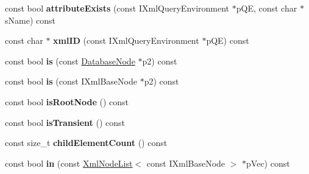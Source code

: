 \begin{DoxyCompactItemize}
\item 
\hypertarget{classgeneral__server_1_1DatabaseNode_a3c6491f102f4aa34694dbfd75b604fc4}{const bool {\bfseries attribute\-Exists} (const \-I\-Xml\-Query\-Environment $\ast$p\-Q\-E, const char $\ast$s\-Name) const }\label{classgeneral__server_1_1DatabaseNode_a3c6491f102f4aa34694dbfd75b604fc4}

\item 
\hypertarget{classgeneral__server_1_1DatabaseNode_a3a1ff38b852860e067c862c116692a0e}{const char $\ast$ {\bfseries xml\-I\-D} (const \-I\-Xml\-Query\-Environment $\ast$p\-Q\-E) const }\label{classgeneral__server_1_1DatabaseNode_a3a1ff38b852860e067c862c116692a0e}

\item 
\hypertarget{classgeneral__server_1_1DatabaseNode_a44727abe0238201126541c209bc9aba6}{const bool {\bfseries is} (const \hyperlink{classgeneral__server_1_1DatabaseNode}{\-Database\-Node} $\ast$p2) const }\label{classgeneral__server_1_1DatabaseNode_a44727abe0238201126541c209bc9aba6}

\item 
\hypertarget{classgeneral__server_1_1DatabaseNode_ab7c301d969b4e478a6bf0699966b1311}{const bool {\bfseries is} (const \-I\-Xml\-Base\-Node $\ast$p2) const }\label{classgeneral__server_1_1DatabaseNode_ab7c301d969b4e478a6bf0699966b1311}

\item 
\hypertarget{classgeneral__server_1_1DatabaseNode_a404d130c96e24ecb96b72c0ea5b6c825}{const bool {\bfseries is\-Root\-Node} () const }\label{classgeneral__server_1_1DatabaseNode_a404d130c96e24ecb96b72c0ea5b6c825}

\item 
\hypertarget{classgeneral__server_1_1DatabaseNode_aff5a2012d2d5c8aedbca3d2d77787c3f}{const bool {\bfseries is\-Transient} () const }\label{classgeneral__server_1_1DatabaseNode_aff5a2012d2d5c8aedbca3d2d77787c3f}

\item 
\hypertarget{classgeneral__server_1_1DatabaseNode_a6e92e99e360d102bd800aba90cdbc1be}{const size\-\_\-t {\bfseries child\-Element\-Count} () const }\label{classgeneral__server_1_1DatabaseNode_a6e92e99e360d102bd800aba90cdbc1be}

\item 
\hypertarget{classgeneral__server_1_1DatabaseNode_a355684424ae25a2a78155e6078845e17}{const bool {\bfseries in} (const \hyperlink{classgeneral__server_1_1XmlNodeList}{\-Xml\-Node\-List}$<$ const \-I\-Xml\-Base\-Node $>$ $\ast$p\-Vec) const }\label{classgeneral__server_1_1DatabaseNode_a355684424ae25a2a78155e6078845e17}


\end{DoxyCompactItemize}
